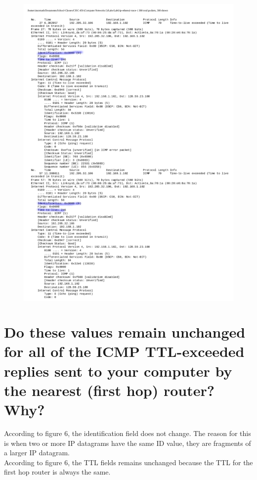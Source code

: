 \documentclass{article}
\begin{document}
\begin{figure}[h!]
\centering
\includegraphics[scale=0.5]{Q9.pdf}
\caption{}
\end{figure}

\section*{Do these values remain unchanged for all of the ICMP TTL-exceeded replies sent
to your computer by the nearest (first hop) router? Why?}
According to figure 6, the identification field does not change.  The reason for this is when two or more IP datagrams have the same ID value, they are fragments of a larger IP datagram.\\
\newline  According to figure 6, the TTL fields remains unchanged because the TTL for the first hop router is always the same.\\
\clearpage
\end{document}
